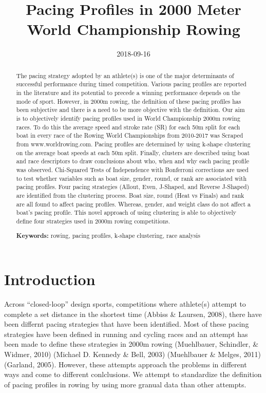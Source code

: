 \documentclass[11pt,]{article}
\title{Pacing Profiles in 2000 Meter World Championship Rowing}
\author{}
\date{2018-09-16}
\begin{document}
\maketitle
\begin{abstract}
The pacing strategy adopted by an athlete(s) is one of the major
determinants of successful performance during timed competition. Various
pacing profiles are reported in the literature and its potential to
precede a winning performance depends on the mode of sport. However, in
2000m rowing, the definition of these pacing profiles has been
subjective and there is a need to be more objective with the definition.
Our aim is to objectively identify pacing profiles used in World
Championship 2000m rowing races. To do this the average speed and stroke
rate (SR) for each 50m split for each boat in every race of the Rowing
World Championships from 2010-2017 was Scraped from www.worldrowing.com.
Pacing profiles are determined by using k-shape clustering on the
average boat speeds at each 50m split. Finally, clusters are described
using boat and race descriptors to draw conclusions about who, when and
why each pacing profile was observed. Chi-Squared Tests of Independence
with Bonferroni corrections are used to test whether variables such as
boat size, gender, round, or rank are associated with pacing profiles.
Four pacing strategies (Allout, Even, J-Shaped, and Reverse J-Shaped)
are identified from the clustering process. Boat size, round (Heat vs
Finals) and rank are all found to affect pacing profiles. Whereas,
gender, and weight class do not affect a boat's pacing profile. This
novel approach of using clustering is able to objectively define four
strategies used in 2000m rowing competitions. \par \textbf{Keywords:}
rowing, pacing profiles, k-shape clustering, race analysis
\end{abstract}

\pagebreak

\section{Introduction}\label{introduction}

Across ``closed-loop'' design sports, competitions where athlete(s)
attempt to complete a set distance in the shortest time (Abbiss \&
Laursen, 2008), there have been differnt pacing strategies that have
been identified. Most of these pacing strategies have been defined in
running and cycling races and an attempt has been made to define these
strategies in 2000m rowing (Muehlbauer, Schindler, \& Widmer, 2010)
(Michael D. Kennedy \& Bell, 2003) (Muehlbauer \& Melges, 2011)
(Garland, 2005). However, these attempts approach the problems in
different ways and come to different conlclusions. We attempt to
standardize the definition of pacing profiles in rowing by using more
granual data than other attempts.
\end{document}
